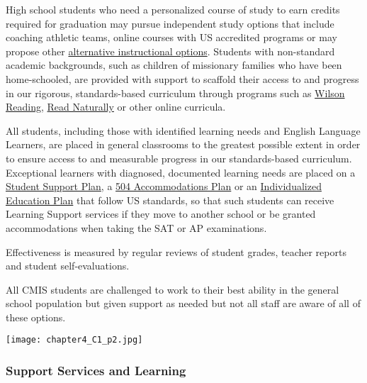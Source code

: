 
\begin{findings}
High school students who need a personalized course of study to earn credits required for graduation may pursue independent study options that include coaching athletic teams, online courses with US accredited programs or may propose other \href{http://www.ck12.org/}{alternative instructional options}. Students with non-standard academic backgrounds, such as children of missionary families who have been home-schooled, are provided with support to scaffold their access to and progress in our rigorous, standards-based curriculum through programs such as \href{http://www.wilsonlanguage.com/programs/wilson-reading-system/}{Wilson Reading}, \href{https://www.readnaturally.com/}{Read Naturally} or other online curricula.

All students, including those with identified learning needs and English Language Learners, are placed in general classrooms to the greatest possible extent in order to ensure access to and measurable progress in our standards-based curriculum. Exceptional learners with diagnosed, documented learning needs are placed on a \href{https://drive.google.com/drive/u/0/folders/0B_rFN7xA3AUNdlVaY2E1WGo1bUE}{Student Support Plan}, a \href{https://drive.google.com/drive/u/0/folders/0B_rFN7xA3AUNdlVaY2E1WGo1bUE}{504 Accommodations Plan} or an \href{https://drive.google.com/drive/u/0/folders/0B_rFN7xA3AUNdlVaY2E1WGo1bUE}{Individualized Education Plan} that follow US standards, so that such students can receive Learning Support services if they move to another school or be granted accommodations when taking the SAT or AP examinations. 

Effectiveness is measured by regular reviews of student grades, teacher reports and student self-evaluations.


All CMIS students are challenged to work to their best ability in the general school population but given support as needed but not all staff are aware of all of these options.
\end{findings}

{\centering\texttt{[image: chapter4\_C1\_p2.jpg]}}

\subsubsection{Support Services and Learning}

